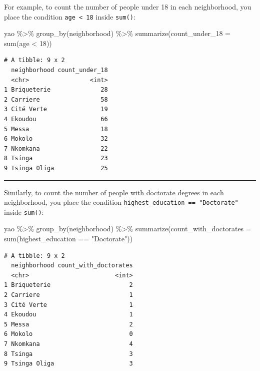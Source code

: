 \documentclass[
  letterpaper,
  DIV=11,
  numbers=noendperiod]{scrreprt}
\newenvironment{Shaded}{\begin{snugshade}}{\end{snugshade}}
\newcommand{\AttributeTok}[1]{\textcolor[rgb]{0.40,0.45,0.13}{#1}}
\newcommand{\DecValTok}[1]{\textcolor[rgb]{0.68,0.00,0.00}{#1}}
\newcommand{\FunctionTok}[1]{\textcolor[rgb]{0.28,0.35,0.67}{#1}}
\newcommand{\NormalTok}[1]{\textcolor[rgb]{0.00,0.23,0.31}{#1}}
\newcommand{\SpecialCharTok}[1]{\textcolor[rgb]{0.37,0.37,0.37}{#1}}
\newcommand{\StringTok}[1]{\textcolor[rgb]{0.13,0.47,0.30}{#1}}
\begin{document}
For example, to count the number of people under 18 in each
neighborhood, you place the condition \texttt{age\ \textless{}\ 18}
inside \texttt{sum()}:

\begin{Shaded}
\begin{Highlighting}[]
\NormalTok{yao }\SpecialCharTok{\%\textgreater{}\%} 
  \FunctionTok{group\_by}\NormalTok{(neighborhood) }\SpecialCharTok{\%\textgreater{}\%} 
  \FunctionTok{summarize}\NormalTok{(}\AttributeTok{count\_under\_18 =} \FunctionTok{sum}\NormalTok{(age }\SpecialCharTok{\textless{}} \DecValTok{18}\NormalTok{))}
\end{Highlighting}
\end{Shaded}

\begin{verbatim}
# A tibble: 9 x 2
  neighborhood count_under_18
  <chr>                 <int>
1 Briqueterie              28
2 Carriere                 58
3 Cité Verte               19
4 Ekoudou                  66
5 Messa                    18
6 Mokolo                   32
7 Nkomkana                 22
8 Tsinga                   23
9 Tsinga Oliga             25
\end{verbatim}

\begin{center}\rule{0.5\linewidth}{0.5pt}\end{center}

Similarly, to count the number of people with doctorate degrees in each
neighborhood, you place the condition
\texttt{highest\_education\ ==\ "Doctorate"} inside \texttt{sum()}:

\begin{Shaded}
\begin{Highlighting}[]
\NormalTok{yao }\SpecialCharTok{\%\textgreater{}\%} 
  \FunctionTok{group\_by}\NormalTok{(neighborhood) }\SpecialCharTok{\%\textgreater{}\%} 
  \FunctionTok{summarize}\NormalTok{(}\AttributeTok{count\_with\_doctorates =} \FunctionTok{sum}\NormalTok{(highest\_education }\SpecialCharTok{==} \StringTok{"Doctorate"}\NormalTok{))}
\end{Highlighting}
\end{Shaded}

\begin{verbatim}
# A tibble: 9 x 2
  neighborhood count_with_doctorates
  <chr>                        <int>
1 Briqueterie                      2
2 Carriere                         1
3 Cité Verte                       1
4 Ekoudou                          1
5 Messa                            2
6 Mokolo                           0
7 Nkomkana                         4
8 Tsinga                           3
9 Tsinga Oliga                     3
\end{verbatim}
\end{document}
